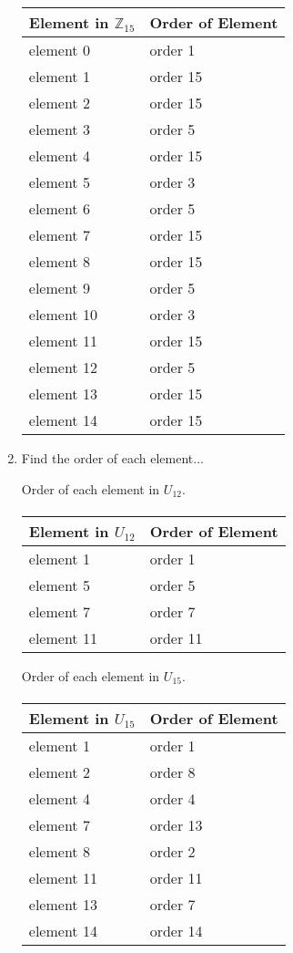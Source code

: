 \documentclass{amsart}
\begin{document}
\begin{enumerate}
\begin{tabular}{ll}
    Element in $\mathbb{Z}_{15}$ & Order of Element \\
    \hline
    element 0 & order 1 \\
    element 1 & order 15 \\
    element 2 & order 15 \\
    element 3 & order 5 \\
    element 4 & order 15 \\
    element 5 & order 3 \\
    element 6 & order 5 \\
    element 7 & order 15 \\
    element 8 & order 15 \\
    element 9 & order 5 \\
    element 10 & order 3 \\
    element 11 & order 15 \\
    element 12 & order 5 \\
    element 13 & order 15 \\
    element 14 & order 15
    
    \end{tabular}
    
    \item Find the order of each element...
    
    Order of each element in $U_{12}$.
    \vspace{4pt}
    \paragraph{}
    \begin{tabular}{ll}
    Element in $U_{12}$ & Order of Element \\
    \hline
    element 1 & order 1 \\
    element 5 & order 5 \\
    element 7 & order 7 \\
    element 11 & order 11 \\
    \end{tabular}
    
    Order of each element in $U_{15}$.
    \vspace{4pt}
    \paragraph{}
    
    \begin{tabular}{ll}
    Element in $U_{15}$ & Order of Element \\
    \hline
    element 1 & order 1 \\
    element 2 & order 8 \\
    element 4 & order 4 \\
    element 7 & order 13 \\
    element 8 & order 2 \\
    element 11 & order 11 \\
    element 13 & order 7 \\
    element 14 & order 14 \\
    \end{tabular}
    

\end{enumerate}
\end{document}
